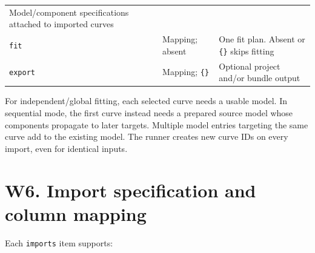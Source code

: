 \documentclass[
  10pt,
  a4paper,
  oneside]{scrreprt}
\begin{document}
\begin{longtable}[]{@{}lll@{}}
\begin{minipage}[t]{0.30\columnwidth}
Model/component specifications attached to imported curves\strut
\end{minipage}\tabularnewline
\begin{minipage}[t]{0.30\columnwidth}\raggedright
\texttt{fit}\strut
\end{minipage} & \begin{minipage}[t]{0.30\columnwidth}\raggedright
Mapping; absent\strut
\end{minipage} & \begin{minipage}[t]{0.30\columnwidth}\raggedright
One fit plan. Absent or \texttt{\{\}} skips fitting\strut
\end{minipage}\tabularnewline
\begin{minipage}[t]{0.30\columnwidth}\raggedright
\texttt{export}\strut
\end{minipage} & \begin{minipage}[t]{0.30\columnwidth}\raggedright
Mapping; \texttt{\{\}}\strut
\end{minipage} & \begin{minipage}[t]{0.30\columnwidth}\raggedright
Optional project and/or bundle output\strut
\end{minipage}\tabularnewline
\bottomrule
\end{longtable}

For independent/global fitting, each selected curve needs a usable
model. In sequential mode, the first curve instead needs a prepared
source model whose components propagate to later targets. Multiple model
entries targeting the same curve add to the existing model. The runner
creates new curve IDs on every import, even for identical inputs.

\hypertarget{w6.-import-specification-and-column-mapping}{%
\section{W6. Import specification and column
mapping}\label{w6.-import-specification-and-column-mapping}}

Each \texttt{imports} item supports:
\end{document}
